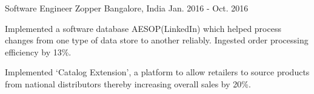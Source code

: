 \begin{cventries}
  \cventry
    {Software Engineer} %
    {Zopper} %
    {Bangalore, India} %
    {Jan. 2016 - Oct. 2016} %
    {
      \begin{cvitems} %
        \item {Implemented a software database AESOP(LinkedIn) which helped process changes from one type of data store to another reliably. Ingested order processing efficiency by 13\%. }
        \item {Implemented ‘Catalog Extension’, a platform to allow retailers to source products from national distributors thereby increasing overall sales by 20\%.}
      \end{cvitems}
    }
\end{cventries}
